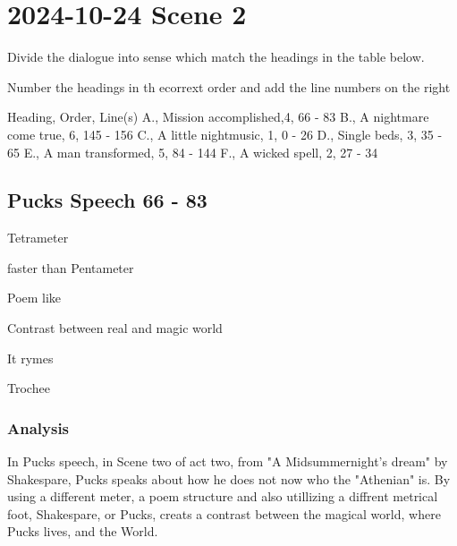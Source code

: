 \section{2024-10-24 Scene 2}

\startframedtask

\startitemize[packed,a]

\item Divide the dialogue into sense which match the headings in the table below.
\item Number the headings in th ecorrext order and add the line numbers on the right

\stopitemize

\stopframedtask


\startplacetable[location={here,none},title={}]
\setupTABLE[r][1][background=color,backgroundcolor=gray]
\setupTABLE[c][3,4][align=middle]
\bTABLE[frame=off]
\startCSV
[nc=2] Heading, Order, Line(s)
A., Mission accomplished,4, 66 - 83
B., A nightmare come true, 6, 145 - 156 
C., A little nightmusic, 1, 0 - 26
D., Single beds, 3, 35 - 65
E., A man transformed, 5, 84 - 144
F., A wicked spell, 2, 27 - 34 
\stopCSV
\eTABLE
\stopplacetable

\subsection{Pucks Speech 66 - 83}

\startitemize[packed]

\item Tetrameter
\startitemize[packed]
\item faster than Pentameter
\stopitemize
\item Poem like
\startitemize[packed]
\item Contrast between real and magic world
\stopitemize
\item It rymes
\item Trochee
\stopitemize


\subsubsection{Analysis}

In Pucks speech, in Scene two of act two, from "A Midsummernight's dream" by
Shakespare, Pucks speaks about how he does not now who the "Athenian" is. By
using a different meter, a poem structure and also utillizing a diffrent
metrical foot, Shakespare, or Pucks, creats a contrast between the magical
world, where Pucks lives, and the  World.


